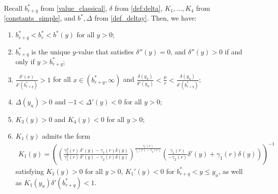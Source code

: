 \documentclass[10pt,a4paper]{amsart}
\begin{document}
\begin{lemma}\label{lemma:yl}
Recall $b^*_{r+q}$ from \eqref{value_classical}, $\delta$ from \eqref{def:delta}, $K_1, \ldots, K_4$ from \eqref{constants_simple}, and $b^*, \Delta$ from \eqref{def_deltay}. 
Then, we have:
\begin{enumerate}[\rm (i)]
\item 
$b^*_{r+q} < b^*_{r} < b^*(y)$ for all $y > 0$;
\item 
$b^*_{r+q}$ is the unique $y$-value that satisfies $\delta''(y)=0$, 
and 
$\delta''(y) > 0$ if and only if $y > b^*_{r+q}$;
\item 
$\frac{\delta'(x)}{\delta'(b^*_{r+q})}>1$ for all $x\in (b^*_{r+q},\infty)$ 
and 
$\frac{\delta(y_u)}{\delta'(y_u)}< \frac{\mu}{r} < \frac{\delta(y_u)}{\delta'(b^*_{r+q})}$;
\item $\Delta(y_u)>0$ and $-1 < \Delta'(y) < 0$ for all $y > 0$;
\item $K_3(y) > 0$ and $K_4(y) < 0$ for all $y > 0$;
\item $K_1(y)$ admits the form
\begin{align}\label{k1_form} 
K_1(y)= \left( \left(\frac{\gamma_2^2(r)}{\gamma_1^2(r)}\frac{\delta'(y) - \gamma_1(r)\delta(y)}{\delta'(y) - \gamma_2(r)\delta(y)}  \right)^{\frac{\gamma_1(r)}{\gamma_1(r) - \gamma_2(r)}}
\left(\frac{\gamma_1(r)}{-\gamma_2(r)}\delta'(y) + \gamma_1(r)\delta(y) \right)\right)^{-1}
\end{align}
satisfying $K_1(y) >0$ for all $y > 0$, $K_1'(y) < 0$ for $b^*_{r+q} < y \leq y_u$, as well as $K_1(y_u)\delta'(b^*_{r+q})<1$.
\end{enumerate}
\end{lemma}
\end{document}
